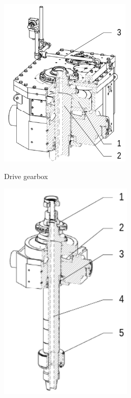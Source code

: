 \begin{figure}[h]
	\centering
	\begin{subfigure}[t]{0.4\textwidth}
         \centering
	 \includegraphics[width=.7\textwidth]{figures/topdrive_drillingunit_drive_gearbox.png}
	 \label{fig:topdrive-drillingunit-drive-gearbox}
	 \caption{Drive gearbox}
     \end{subfigure}%
     \begin{subfigure}[t]{0.4\textwidth}
         \centering
 \includegraphics[width=0.7\textwidth]{figures/topdrive_drillingunit_drive_mainshaft.png}

\end{subfigure}
\end{figure}
